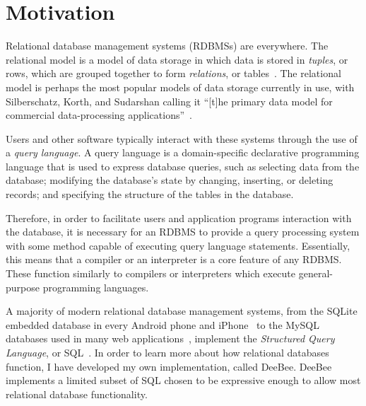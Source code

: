 
\graphicspath{{assets/figures/}}
\usepackage{minted}

\renewcommand\listoflistingscaption{List of Listings}
\usepackage[nottoc,numbib]{tocbibind}


\MYHEADERS{}
\PLEDGE{}
\tableofcontents
\listoflistings
\vfill
\pagebreak
\section{Motivation}

Relational database management systems (RDBMSs) are everywhere. The relational model is a model of data storage in which data is stored in \textit{tuples}, or rows, which are grouped together to form \textit{relations}, or tables~\cite{silberschatz2010database,harrington2009relational,garcia2000database}. The relational model is perhaps the most popular models of data storage currently in use, with Silberschatz, Korth, and Sudarshan calling it ``[t]he primary data model for commercial data-processing applications''~\cite[page 39]{silberschatz2010database}.

Users and other software typically interact with these systems through the use of a \textit{query language}. A query language is a domain-specific declarative programming language that is used to express database queries, such as selecting data from the database; modifying the database's state by changing, inserting, or deleting records; and specifying the structure of the tables in the database. 

Therefore, in order to facilitate users and application programs interaction with the database, it is necessary for an RDBMS to provide a query processing system with some method capable of executing query language statements. Essentially, this means that a compiler or an interpreter is a core feature of any RDBMS. These function similarly to compilers or interpreters which execute general-purpose programming languages.

A majority of modern relational database management systems, from the SQLite embedded database in every Android phone and iPhone~\cite{sqliteFamous} to the MySQL databases used in many web applications~\cite{onLamp}, implement the \textit{Structured Query Language}, or SQL~\cite{silberschatz2010database}. In order to learn more about how relational databases function, I have developed my own implementation, called DeeBee. DeeBee implements a limited subset of SQL chosen to be expressive enough to allow most relational database functionality. 

